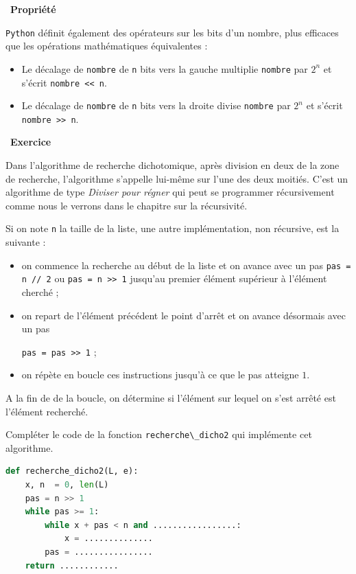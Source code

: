 \documentclass[
  11pt,
]{article}
\newcommand{\passthrough}[1]{#1}
\newcounter{exo}
\newenvironment{exercice}[1]
{\par \medskip   \addtocounter{exo}{1} \noindent  
\begin{bclogo}[arrondi =0.1,   noborder = true, logo=\bccrayon, marge=4]{~\textbf{Exercice} \textbf{\theexo} {\itshape #1} }  \par}
{
\end{bclogo}
 \par \bigskip }
\newcounter{thme}
\newcounter{prop}
\newenvironment{propriete}[1]
{\par \medskip   \addtocounter{prop}{1} \noindent  
\begin{bclogo}[arrondi =0.1,  ombre = true, barre=none, logo=\bcbook, marge=4]{~\textbf{Propriété} \textbf{\theprop} {\itshape #1} }   \par}
{
\end{bclogo}
 \par \bigskip }
\newcounter{def}
\newcounter{alg}
\newcounter{prog}
\begin{document}
\begin{propriete}{}

\passthrough{\lstinline!Python!} définit également des opérateurs sur
les bits d'un nombre, plus efficaces que les opérations mathématiques
équivalentes :

\begin{itemize}
\item
  Le décalage de \passthrough{\lstinline!nombre!} de
  \passthrough{\lstinline!n!} bits vers la gauche multiplie
  \passthrough{\lstinline!nombre!} par \(2^{n}\) et s'écrit
  \passthrough{\lstinline!nombre << n!}.
\item
  Le décalage de \passthrough{\lstinline!nombre!} de
  \passthrough{\lstinline!n!} bits vers la droite divise
  \passthrough{\lstinline!nombre!} par \(2^{n}\) et s'écrit
  \passthrough{\lstinline!nombre >> n!}.
\end{itemize}

\end{propriete}

\begin{exercice}{}

Dans l'algorithme de recherche dichotomique, après division en deux de
la zone de recherche, l'algorithme s'appelle lui-même sur l'une des deux
moitiés. C'est un algorithme de type \textit{Diviser pour régner} qui
peut se programmer récursivement comme nous le verrons dans le chapitre
sur la récursivité.

Si on note \lstinline+n+ la taille de la liste, une autre
implémentation, non récursive, est la suivante :

\begin{itemize}
\item
  on commence la recherche au début de la liste et on avance avec un pas
  \passthrough{\lstinline!pas = n // 2!} ou
  \passthrough{\lstinline!pas = n >> 1!} jusqu'au premier élément
  supérieur à l'élément cherché ;
\item
  on repart de l'élément précédent le point d'arrêt et on avance
  désormais avec un pas

  \passthrough{\lstinline!pas = pas >> 1!} ;
\item
  on répète en boucle ces instructions jusqu'à ce que le pas atteigne
  \(1\).
\end{itemize}

A la fin de de la boucle, on détermine si l'élément sur lequel on s'est
arrêté est l'élément recherché.

Compléter le code de la fonction
\passthrough{\lstinline!recherche\_dicho2!} qui implémente cet
algorithme.

\begin{lstlisting}[language=Python]
def recherche_dicho2(L, e):
    x, n  = 0, len(L)
    pas = n >> 1
    while pas >= 1:
        while x + pas < n and .................:
            x = ..............
        pas = ................
    return ............
\end{lstlisting}

\end{exercice}
\end{document}
